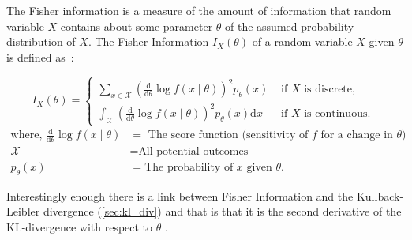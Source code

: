 The Fisher information is a measure of the amount of information that random variable $X$ contains about some parameter $\theta$ of the assumed probability distribution of $X$. The Fisher Information $I_X(\theta)$ of a random variable $X$ given $\theta$ is defined as~\cite{Ly2017}:

\begin{equation}
    I_X(\theta)= \begin{cases}\sum_{x \in \mathcal{X}}\left(\frac{\mathrm{d}}{\mathrm{d} \theta} \log f(x \mid \theta)\right)^2 p_\theta(x) & \text { if } X \text { is discrete, } \\ \int_{\mathcal{X}}\left(\frac{\mathrm{d}}{\mathrm{d} \theta} \log f(x \mid \theta)\right)^2 p_\theta(x) \mathrm{d} x & \text { if } X \text { is continuous. }\end{cases}
    \label{eq:fisher_information}
\end{equation}
\begin{equation*}
    \begin{aligned}
        \text{where, }
        \frac{\mathrm{d}}{\mathrm{d} \theta}\log f(x \mid \theta) &= \text{ The score function (sensitivity of $f$ for a change in $\theta$)} \\
        \mathcal{X} &= \text{All potential outcomes} \\
        p_\theta(x) &= \text{The probability of $x$ given $\theta$}.
    \end{aligned}
\end{equation*}

Interestingly enough there is a link between Fisher Information and the Kullback-Leibler divergence (\autoref{sec:kl_div}) and that is that it is the second derivative of the KL-divergence with respect to $\theta$ \cite{Cover1991}.